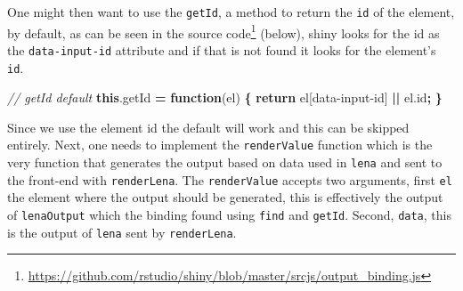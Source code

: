 \documentclass[
]{krantz}
\makeatletter
\newenvironment{Shaded}{\begin{snugshade}}{\end{snugshade}}
\newcommand{\AttributeTok}[1]{\textcolor[rgb]{0.61,0.61,0.61}{#1}}
\newcommand{\CommentTok}[1]{\textcolor[rgb]{0.37,0.37,0.37}{\textit{#1}}}
\newcommand{\ControlFlowTok}[1]{\textcolor[rgb]{0.27,0.27,0.27}{\textbf{#1}}}
\newcommand{\KeywordTok}[1]{\textcolor[rgb]{0.27,0.27,0.27}{\textbf{#1}}}
\newcommand{\NormalTok}[1]{#1}
\newcommand{\OperatorTok}[1]{\textcolor[rgb]{0.43,0.43,0.43}{\textbf{#1}}}
\newcommand{\StringTok}[1]{\textcolor[rgb]{0.5,0.5,0.5}{#1}}
\newcommand{\VariableTok}[1]{\textcolor[rgb]{0,0,0}{#1}}
\renewcommand{\href}[2]{#2\footnote{\url{#1}}}
\newenvironment{kframe}{%
\medskip{}
\setlength{\fboxsep}{.8em}
 \def\at@end@of@kframe{}%
 \ifinner\ifhmode%
  \def\at@end@of@kframe{\end{minipage}}%
  \begin{minipage}{\columnwidth}%
 \fi\fi%
 \def\FrameCommand##1{\hskip\@totalleftmargin \hskip-\fboxsep
 \colorbox{shadecolor}{##1}\hskip-\fboxsep
     \hskip-\linewidth \hskip-\@totalleftmargin \hskip\columnwidth}%
 \MakeFramed {\advance\hsize-\width
   \@totalleftmargin\z@ \linewidth\hsize
   \@setminipage}}%
 {\par\unskip\endMakeFramed%
 \at@end@of@kframe}
\renewenvironment{Shaded}{\begin{kframe}}{\end{kframe}}
\makeatother
\begin{document}
One might then want to use the \texttt{getId}, a method to return the \texttt{id} of the element, by default, as can be seen in the \href{https://github.com/rstudio/shiny/blob/master/srcjs/output_binding.js}{source code} (below), shiny looks for the id as the \texttt{data-input-id} attribute and if that is not found it looks for the element's \texttt{id}.

\begin{Shaded}
\begin{Highlighting}[]
\CommentTok{// getId default}
\KeywordTok{this}\NormalTok{.}\AttributeTok{getId} \OperatorTok{=} \KeywordTok{function}\NormalTok{(el) }\OperatorTok{\{}
  \ControlFlowTok{return}\NormalTok{ el[}\StringTok{\textquotesingle{}data{-}input{-}id\textquotesingle{}}\NormalTok{] }\OperatorTok{||} \VariableTok{el}\NormalTok{.}\AttributeTok{id}\OperatorTok{;}
\OperatorTok{\}}
\end{Highlighting}
\end{Shaded}

Since we use the element id the default will work and this can be skipped entirely. Next, one needs to implement the \texttt{renderValue} function which is the very function that generates the output based on data used in \texttt{lena} and sent to the front-end with \texttt{renderLena}. The \texttt{renderValue} accepts two arguments, first \texttt{el} the element where the output should be generated, this is effectively the output of \texttt{lenaOutput} which the binding found using \texttt{find} and \texttt{getId}. Second, \texttt{data}, this is the output of \texttt{lena} sent by \texttt{renderLena}.
\end{document}
